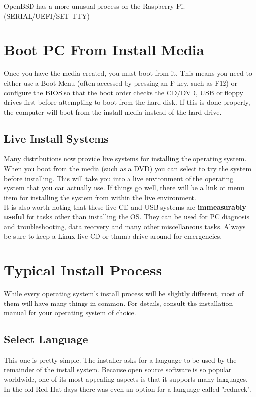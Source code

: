 OpenBSD has a more unusual process on the Raspberry Pi.  (SERIAL/UEFI/SET TTY)

\section{Boot PC From Install Media}

Once you have the media created, you must boot from it.  This means you need to either use a Boot Menu (often accessed by pressing an F key, such as F12) or configure the BIOS so that the boot order checks the CD/DVD, USB or floppy drives first before attempting to boot from the hard disk.  If this is done properly, the computer will boot from the install media instead of the hard drive.

\subsection{Live Install Systems}

Many distributions now provide live systems for installing the operating system.  When you boot from the media (such as a DVD) you can select to try the system before installing.  This will take you into a live environment of the operating system that you can actually use.  If things go well, there will be a link or menu item for installing the system from within the live environment.\\

It is also worth noting that these live CD and USB systems are \textbf{immeasurably useful} for tasks other than installing the OS.  They can be used for PC diagnosis and troubleshooting, data recovery and many other miscellaneous tasks.  Always be sure to keep a Linux live CD or thumb drive around for emergencies.

\section{Typical Install Process}

While every operating system's install process will be slightly different, most of them will have many things in common.  For details, consult the installation manual for your operating system of choice.

\subsection{Select Language}

This one is pretty simple.  The installer asks for a language to be used by the remainder of the install system.  Because open source software is so popular worldwide, one of its most appealing aspects is that it supports many languages.  In the old Red Hat days there was even an option for a language called "redneck".

